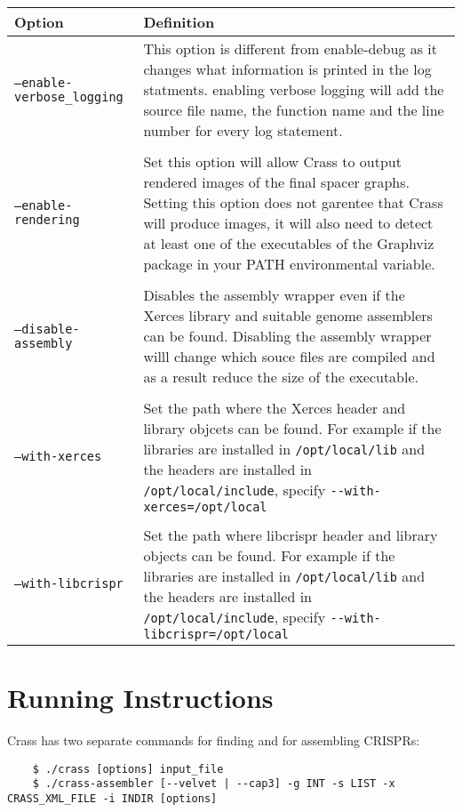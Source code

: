 \documentclass[11pt]{article} %
\newcommand{\longoptionflag}[1]{\texttt{--#1}}
\begin{document}
    \begin{longtable}{  l    p{10cm} }
    \hline
    Option & Definition \\  \hline\hline
   \longoptionflag{enable-verbose\_logging} & This option is different from enable-debug as it changes what information is printed in the log statments.  enabling verbose logging will add the source file name, the function name and the line number for every log statement. \\ \\    
\longoptionflag{enable-rendering} &  Set this option will allow Crass to output rendered images of the final spacer graphs.  Setting this option does not garentee that Crass will produce images, it will also need to detect at least one of the executables of the Graphviz package in your PATH environmental variable. \\  \\
   \longoptionflag{disable-assembly} & Disables the assembly wrapper even if the Xerces library and suitable genome assemblers can be found.  Disabling the assembly wrapper willl change which souce files are compiled and as a result reduce the size of the executable. \\ \\
\longoptionflag{with-xerces} & Set the path where the Xerces header and library objcets can be found.  For example if the libraries are installed in \lstinline$/opt/local/lib$ and the headers are installed in \lstinline$/opt/local/include$, specify \lstinline$--with-xerces=/opt/local$\\ \\
\longoptionflag{with-libcrispr} & Set the path where libcrispr header and library objects can be found. For example if the libraries are installed in \lstinline$/opt/local/lib$ and the headers are installed in \lstinline$/opt/local/include$, specify \lstinline$--with-libcrispr=/opt/local$\\

    \hline
    \end{longtable}

\section{Running Instructions}
Crass has two separate commands for finding and for assembling CRISPRs:
 \begin{lstlisting}
	$ ./crass [options] input_file
    $ ./crass-assembler [--velvet | --cap3] -g INT -s LIST -x CRASS_XML_FILE -i INDIR [options]
\end{lstlisting}
\end{document}
